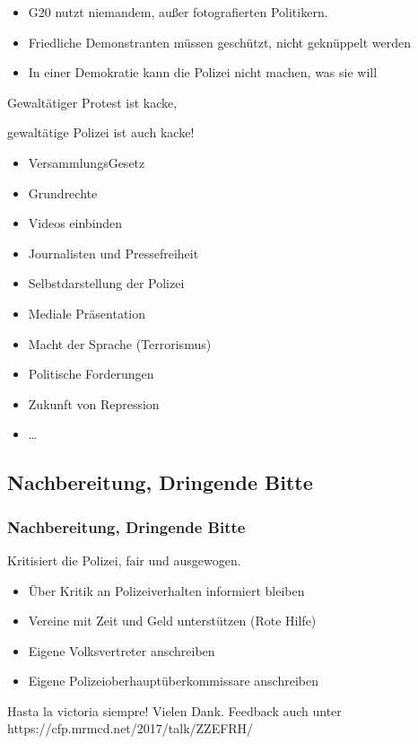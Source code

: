 \documentclass[]{beamer}
\begin{document}
\begin{frame}
	\begin{itemize}
		\item G20 nutzt niemandem, außer fotografierten Politikern.
		\item Friedliche Demonstranten müssen geschützt, nicht geknüppelt werden
		\item In einer Demokratie kann die Polizei nicht machen, was sie will
	\end{itemize}
	\vfill
	Gewaltätiger Protest ist kacke, \par
	gewaltätige Polizei ist auch kacke!
\end{frame}

\begin{frame}
	\begin{itemize}
		\item VersammlungsGesetz
		\item Grundrechte
		\item Videos einbinden
		\item Journalisten und Pressefreiheit
		\item Selbstdarstellung der Polizei
		\item Mediale Präsentation
		\item Macht der Sprache (Terrorismus)
		\item Politische Forderungen
		\item Zukunft von Repression 
		\item \dots
	\end{itemize}
\end{frame}

	\begin{frame}
	\subsection{Nachbereitung, Dringende Bitte}
	\frametitle{Nachbereitung, Dringende Bitte}
	Kritisiert die Polizei, fair und ausgewogen.
	\vfill
	\begin{itemize}
		\item Über Kritik an Polizeiverhalten informiert bleiben
		\item Vereine mit Zeit und Geld unterstützen (Rote Hilfe)
		\item Eigene Volksvertreter anschreiben
		\item Eigene Polizeioberhauptüberkommissare anschreiben
	\end{itemize}
	\vfill
	Hasta la victoria siempre!
	\vfill
	Vielen Dank.
	\vfill
	Feedback auch unter https://cfp.mrmcd.net/2017/talk/ZZEFRH/
\end{frame}
\end{document}
